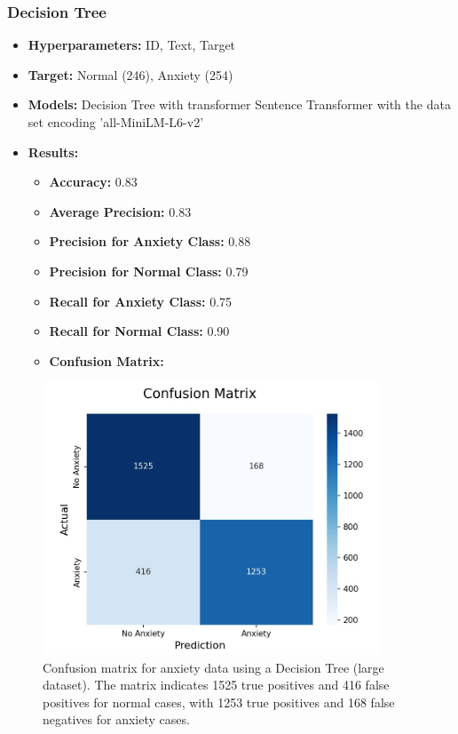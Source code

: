 \documentclass[runningheads,a4paper,11pt]{report}
\begin{document}
\vspace{1cm} %

\subsubsection{Decision Tree}
\label{section:decision}

\begin{itemize}
    \item \textbf{Hyperparameters:} ID, Text, Target
    \item \textbf{Target:} Normal (246), Anxiety (254)
    \item \textbf{Models:} Decision Tree with transformer Sentence Transformer with the data set encoding 'all-MiniLM-L6-v2'
    \item \textbf{Results:}
    \begin{itemize}
        \item \textbf{Accuracy:} 0.83
        \item \textbf{Average Precision:} 0.83
        \item \textbf{Precision for Anxiety Class:} 0.88
        \item \textbf{Precision for Normal Class:} 0.79
        \item \textbf{Recall for Anxiety Class:} 0.75
        \item \textbf{Recall for Normal Class:} 0.90
        \item \textbf{Confusion Matrix:}
    \end{itemize}
\end{itemize}

\begin{figure}[h]
\centering
\includegraphics[width=0.9\textwidth]{Anxiety-Data-DecisionTree.jpg}
\caption[Confusion matrix for anxiety data (decision tree)]{Confusion matrix for anxiety data using a Decision Tree (large dataset). The matrix indicates 1525 true positives and 416 false positives for normal cases, with 1253 true positives and 168 false negatives for anxiety cases.}
\end{figure}
\end{document}
